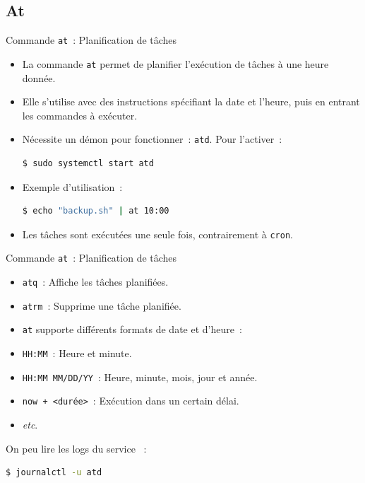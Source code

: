 \documentclass{beamer}
\begin{document}
    \subsection{At}\label{subsec:at}

    \begin{frame}[fragile]{Commande \lstinline{at}~: Planification de tâches}
        \begin{itemize}
            \item La commande \lstinline{at} permet de planifier l'exécution de tâches à une heure donnée.
            \item Elle s'utilise avec des instructions spécifiant la date et l'heure, puis en entrant les commandes à exécuter.
            \item Nécessite un démon pour fonctionner~: \lstinline{atd}.
            Pour l'activer~:
            \begin{lstlisting}[language=bash]
$ sudo systemctl start atd
            \end{lstlisting}
            \item Exemple d'utilisation~:
            \begin{lstlisting}[language=bash]
$ echo "backup.sh" | at 10:00
            \end{lstlisting}
            \item Les tâches sont exécutées une seule fois, contrairement à \lstinline{cron}.
        \end{itemize}
    \end{frame}

    \begin{frame}[fragile]{Commande \lstinline{at}~: Planification de tâches}
        \begin{itemize}
            \item \lstinline{atq}~: Affiche les tâches planifiées.
            \item \lstinline{atrm}~: Supprime une tâche planifiée.
            \item \lstinline{at} supporte différents formats de date et d'heure~:
            \item \lstinline{HH:MM}~: Heure et minute.
            \item \lstinline{HH:MM MM/DD/YY}~: Heure, minute, mois, jour et année.
            \item \lstinline{now + <durée>}~: Exécution dans un certain délai.
            \item \textit{etc}.
        \end{itemize}
        On peu lire les logs du service \lstinline{}~:
        \begin{lstlisting}[language=bash]
$ journalctl -u atd
        \end{lstlisting}
    \end{frame}
\end{document}
